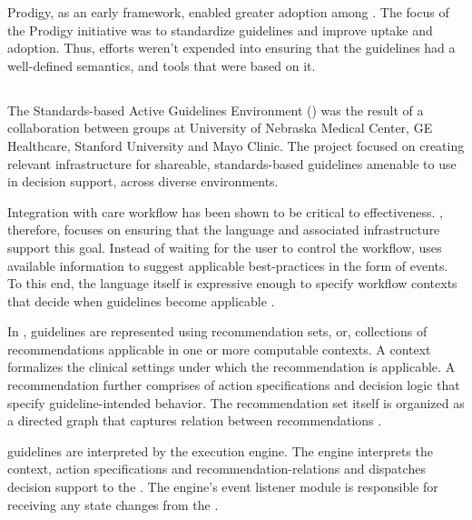 Prodigy, as an early \CDSS{} framework, enabled greater adoption among
\HCPs{}. The focus of the Prodigy initiative was to standardize guidelines and
improve uptake and adoption. Thus, efforts weren't expended into ensuring that
the guidelines had a well-defined semantics, and tools that were based on
it.

\subsection{\SAGE{}}\label{sec:sage}

The Standards-based Active Guidelines Environment (\SAGE{}) was the
result of a collaboration between groups at University of Nebraska
Medical Center, GE Healthcare, Stanford University and Mayo Clinic.
The project focused on creating relevant infrastructure for shareable,
standards-based guidelines amenable to use in decision support, across
diverse \EHR{} environments.

Integration with care workflow has been shown to be critical to \CDSS{}
effectiveness. \SAGE{}, therefore, focuses on ensuring that the language
and associated infrastructure support this goal. Instead of waiting for
the user to control the workflow, \SAGE{} uses available information to
suggest applicable best-practices in the form of events. To this end,
the language itself is expressive enough to specify workflow contexts
that decide when guidelines become applicable \cite{TuAMIA07}.

In \SAGE{}, guidelines are represented using recommendation sets, or,
collections of recommendations applicable in one or more computable
contexts. A context formalizes the clinical settings under which
the recommendation is applicable. A recommendation further comprises
of action specifications and decision logic that specify guideline-intended
\HCP{} behavior. The recommendation set itself is organized as a directed
graph that captures relation between recommendations \cite{TuAMIA07}.

\SAGE{} guidelines are interpreted by the \SAGE{} execution engine.
The engine interprets the context, action specifications
and recommendation-relations and dispatches decision support
to the \EHR{}. The engine's event listener module is responsible
for receiving any state changes from the \EHR{} \cite{RamMEDINFO04}.

